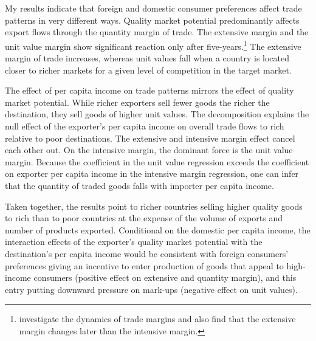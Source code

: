 \documentclass[12pt,a4paper,oneside,times]{article}   	%
\begin{document}
My results indicate that foreign and domestic consumer preferences affect trade patterns in very different ways. Quality market potential predominantly affects export flows through the quantity margin of trade. The extensive margin and the unit value margin show significant reaction only after five-years.\footnote{\cite{Baier2014} investigate the dynamics of trade margins and also find that the extensive margin changes later than the intensive margin.} The extensive margin of trade increases, whereas unit values fall when a country is located closer to richer markets for a given  level of competition in the target market. 

The effect of per capita income on trade patterns mirrors the effect of quality market potential. While richer exporters sell fewer goods  the richer the destination, they sell goods of higher unit values. The decomposition explains the null effect of the exporter's per capita income on overall trade flows to rich relative to poor destinations. The extensive and intensive margin effect cancel each other out. On the intensive margin, the dominant force is the unit value margin. Because the coefficient in the unit value regression exceeds the coefficient on exporter per capita income in the intensive margin regression, one can infer that the quantity of traded goods falls with importer per capita income. 

Taken together, the results point to richer countries selling higher quality goods to rich than to poor countries at the expense of the volume of exports and number of products exported. Conditional on the domestic per capita income,  the interaction effects of the exporter's quality market potential with the destination's per capita income would be consistent with foreign consumers' preferences giving an incentive to enter production of goods that appeal to high-income consumers (positive effect on extensive and quantity margin), and this entry putting downward pressure on mark-ups (negative effect on unit values).

\end{document}
